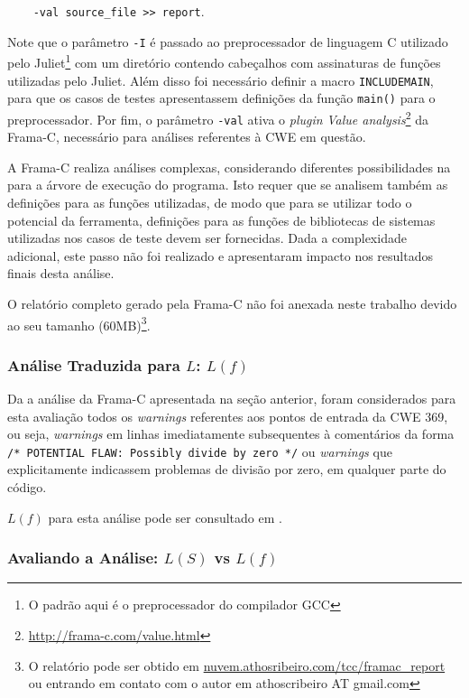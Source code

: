     \lstinline{    -val source_file >> report}.

    Note que o parâmetro \lstinline{-I} é passado ao preprocessador de linguagem C utilizado pelo Juliet\footnote{O padrão aqui é o preprocessador do compilador GCC} com um diretório contendo cabeçalhos com assinaturas de funções utilizadas pelo Juliet. Além disso foi necessário definir a macro \lstinline{INCLUDEMAIN}, para que os casos de testes apresentassem definições da função \lstinline{main()} para o preprocessador. Por fim, o parâmetro \lstinline{-val} ativa o \textit{plugin} \textit{Value analysis}\footnote{\url{http://frama-c.com/value.html}} da Frama-C, necessário para análises referentes à CWE em questão.

  A Frama-C realiza análises complexas, considerando diferentes possibilidades na para a árvore de execução do programa. Isto requer que se analisem também as definições para as funções utilizadas, de modo que para se utilizar todo o potencial da ferramenta, definições para as funções de bibliotecas de sistemas utilizadas nos casos de teste devem ser fornecidas. Dada a complexidade adicional, este passo não foi realizado e apresentaram impacto nos resultados finais desta análise.

  O relatório completo gerado pela Frama-C não foi anexada neste trabalho devido ao seu tamanho (60MB)\footnote{O relatório pode ser obtido em \url{nuvem.athosribeiro.com/tcc/framac_report} ou entrando em contato com o autor em athoscribeiro AT gmail.com}.

  \subsubsection{Análise Traduzida para $L$: $L(f)$}

  Da a análise da Frama-C apresentada na seção anterior, foram considerados para esta avaliação todos os \textit{warnings} referentes aos pontos de entrada da CWE 369, ou seja, \textit{warnings} em linhas imediatamente subsequentes à comentários da forma
  \lstinline{/* POTENTIAL FLAW: Possibly divide by zero */}
  ou \textit{warnings} que explicitamente indicassem problemas de divisão por zero, em qualquer parte do código.

  $L(f)$ para esta análise pode ser consultado em .

  \subsubsection{Avaliando a Análise: $L(S)$ vs $L(f)$}

